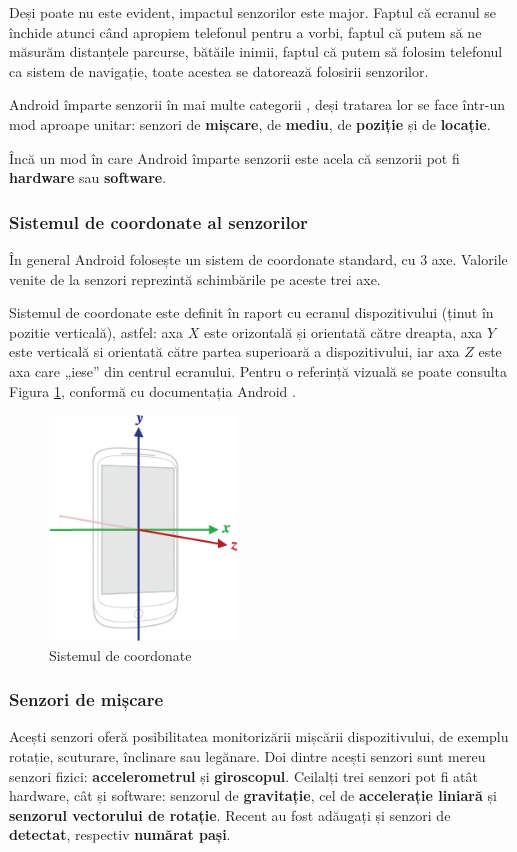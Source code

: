 \documentclass[12pt,a4paper]{article}
\begin{document}
	Deși poate nu este evident, impactul senzorilor este major. Faptul că ecranul se închide atunci când apropiem telefonul pentru a vorbi, faptul că putem să ne măsurăm distanțele parcurse, bătăile inimii, faptul că putem să folosim telefonul ca sistem de navigație, toate acestea se datorează folosirii senzorilor.
	
	Android împarte senzorii în mai multe categorii \cite{DeveloperAndroid}, deși tratarea lor se face într-un mod aproape unitar: senzori de \textbf{mișcare}, de \textbf{mediu}, de \textbf{poziție} și de \textbf{locație}.

	Încă un mod în care Android împarte senzorii este acela că senzorii pot fi \textbf{hardware} sau \textbf{software}.\\
	
\subsubsection{Sistemul de coordonate al senzorilor}
În general Android folosește un sistem de coordonate standard, cu 3 axe. Valorile venite de la senzori reprezintă schimbările pe aceste trei axe.

Sistemul de coordonate este definit în raport cu ecranul dispozitivului (ținut în pozitie verticală), astfel: axa $X$ este orizontală și orientată către dreapta, axa $Y$ este verticală si orientată către partea superioară a dispozitivului, iar axa $Z$ este axa care „iese” din centrul ecranului. Pentru o referință vizuală se poate consulta Figura \ref{fig:axis_device}, conformă cu documentația Android \cite{DeveloperAndroid}.

\begin{figure}[hbtp]
\centering
\includegraphics[width=5cm]{figures/axis_device.png}
\caption{Sistemul de coordonate}
\label{fig:axis_device}
\end{figure}


\subsubsection{Senzori de mișcare}
Acești senzori oferă posibilitatea monitorizării mișcării dispozitivului, de exemplu rotație, scuturare, înclinare sau legănare. Doi dintre acești senzori sunt mereu senzori fizici: \textbf{accelerometrul} și \textbf{giroscopul}. Ceilalți trei senzori pot fi atât hardware, cât și software: senzorul de \textbf{gravitație}, cel de \textbf{accelerație liniară} și \textbf{senzorul vectorului de rotație}. Recent au fost adăugați și senzori de \textbf{detectat}, respectiv \textbf{numărat pași}.
\end{document}
